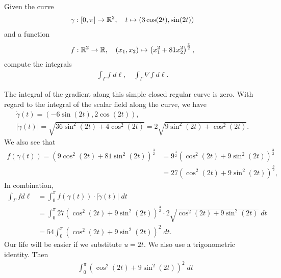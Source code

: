 \documentclass[11pt]{article}
\begin{document}
\begin{exercise}
    Given the curve
    \begin{gather*}
        \gamma : [0,\pi] \to \mathbb{R}^2, \quad t \mapsto ( 3\cos(2t), \sin(2t) )
    \end{gather*}
    and a function
    \begin{gather*}
        f : \mathbb{R}^2 \to \mathbb{R}, \quad (x_1,x_2) \mapsto \left( x_1^2 + 81 x_2^2 \right)^{\frac 3 2},
    \end{gather*}
    compute the integrals 
    \begin{align*}
        \int_\Gamma f \;d\ell, \quad \int_\Gamma \nabla f \;d\ell.
    \end{align*}
\end{exercise}
\begin{solution}     
    The integral of the gradient along this simple closed regular curve is zero.
    With regard to the integral of the scalar field along the curve, we have 
    \begin{gather*}
        \dot\gamma(t) = \left( -6 \sin(2t), 2\cos(2t) \right),
        \\ 
        |\dot\gamma(t)| 
        = 
        \sqrt{ 36 \sin^2(2t) + 4 \cos^2(2t) }
        = 
        2 \sqrt{ 9 \sin^2(2t) + \cos^2(2t) }
        .
    \end{gather*}
    We also see that 
    \begin{align*}
        f(\gamma(t))
        =
        \left( 9\cos^2(2t) + 81 \sin^2(2t) \right)^{\frac 3 2}
        &=
        9^{\frac 3 2 }   \left( \cos^2(2t) + 9 \sin^2(2t) \right)^{\frac 3 2}
        \\&=
        27 \left( \cos^2(2t) + 9 \sin^2(2t) \right)^{\frac 3 2}
        ,
    \end{align*}
    In combination, 
    \begin{align*}
       \int_\Gamma f d\ell
       &=
       \int_0^{\pi} f(\gamma(t)) \cdot |\dot\gamma(t)| \;dt
       \\&=
       \int_0^{\pi} 27 \left( \cos^2(2t) + 9\sin^2(2t) \right)^{\frac 3 2} \cdot 2\sqrt{ \cos^2(2t) + 9\sin^2(2t) } \;dt
       \\&=
       54 \int_0^{\pi} \left( \cos^2(2t) + 9 \sin^2(2t) \right)^{2} \;dt
       .
    \end{align*}
    Our life will be easier if we substitute $u = 2t$. We also use a trigonometric identity. Then
    \begin{align*}
        &
        \int_0^{\pi} \left( \cos^2(2t) + 9 \sin^2(2t) \right)^{2} \;dt

\end{align*}
\end{solution}
\end{document}
